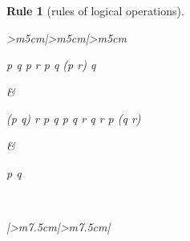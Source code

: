 \documentclass[10pt,a4paper]{book}
\newtheorem{Rule}{Rule}[section]
\begin{document}
\begin{Rule}[rules of logical operations]
\begin{tabular}{>{\centering\arraybackslash}m{5cm}|>{\centering\arraybackslash}m{5cm}|>{\centering\arraybackslash}m{5cm}}
        \begin{fitchproof}[arrayenv=tabular]
            \have {} {p \to q}  {}
            \open
            \have {} {p \land r}  {}
            \have {} {p}  {}
            \have {} {q}  {}
            \close
            \have {} {(p \land r) \to q}  {}
        \end{fitchproof}
        \rule[0pt]{0pt}{0pt} &
        \begin{fitchproof}[arrayenv=tabular]
            \have {} {(p \land q) \to r}  {}
            \open
            \have {} {p}  {}
            \open
            \have {} {q}  {}
            \have {} {p \land q}  {}
            \have {} {r}  {}
            \close
            \have {} {q \to r}  {}
            \close
            \have {} {p \to (q \to r)}  {}
        \end{fitchproof}
        \rule[0pt]{0pt}{0pt} &
        \begin{fitchproof}[arrayenv=tabular]

             
            \open
             {p \land q} 

             
             
             
             
            \close
             

        \end{fitchproof}
        \rule[0pt]{0pt}{0pt}
        \\
    \end{tabular}

    \begin{tabular}{|>{\centering\arraybackslash}m{7.5cm}|>{\centering\arraybackslash}m{7.5cm}|}
        \hline
        \begin{minipage}[t]{\linewidth}
            \centering
            \begin{minipage}[t]{0.48\linewidth}
                \begin{fitchproof}[arrayenv=tabular]
                     {\varphi}
                     {\therefore \varphi \lor \psi } 
                \end{fitchproof}
            \end{minipage}
            \begin{minipage}[t]{0.48\linewidth}
                \begin{fitchproof}[arrayenv=tabular]
                     {\varphi}
                     {\therefore  \psi \lor \varphi} 
                \end{fitchproof}
            \end{minipage}
        \end{minipage}


\end{tabular}
\end{Rule}
\end{document}
